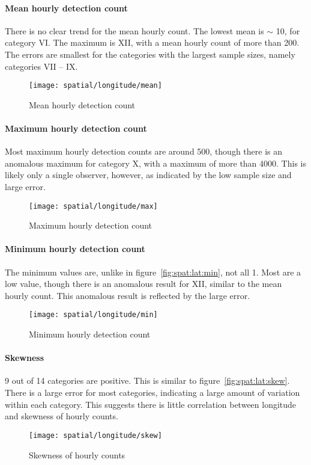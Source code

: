 \paragraph{Mean hourly detection count\\}
There is no clear trend for the mean hourly count. The lowest mean is $\sim$ 10, for category VI. The maximum is XII, with a mean hourly count of more than 200. The errors are smallest for the categories with the largest sample sizes, namely categories VII -- IX.
\begin{figure}[h!]
	\centering
	\texttt{[image: spatial/longitude/mean]}
	\caption{Mean hourly detection count
		\label{fig:spat:lon:mean}}
\end{figure}
\paragraph{Maximum hourly detection count\\}
Most maximum hourly detection counts are around 500, though there is an anomalous maximum for category X, with a maximum of more than 4000. This is likely only a single observer, however, as indicated by the low sample size and large error.
\begin{figure}[h!]
	\centering
	\texttt{[image: spatial/longitude/max]}
	\caption{Maximum hourly detection count
		\label{fig:spat:lon:max}}
\end{figure}
\paragraph{Minimum hourly detection count\\}
The minimum values are, unlike in figure~\ref{fig:spat:lat:min}, not all 1. Most are a low value, though there is an anomalous result for XII, similar to the mean hourly count. This anomalous result is reflected by the large error.
\begin{figure}[h!]
	\centering
	\texttt{[image: spatial/longitude/min]}
	\caption{Minimum hourly detection count 
		\label{fig:spat:long:min}}
\end{figure}
\paragraph{Skewness\\}
9 out of 14 categories are positive. This is similar to figure~\ref{fig:spat:lat:skew}. There is a large error for most categories, indicating a large amount of variation within each category. This suggests there is little correlation between longitude and skewness of hourly counts.
\begin{figure}[h!]
	\centering
	\texttt{[image: spatial/longitude/skew]}
	\caption{Skewness of hourly counts
		\label{fig:spat:lon:skew}}
\end{figure}
